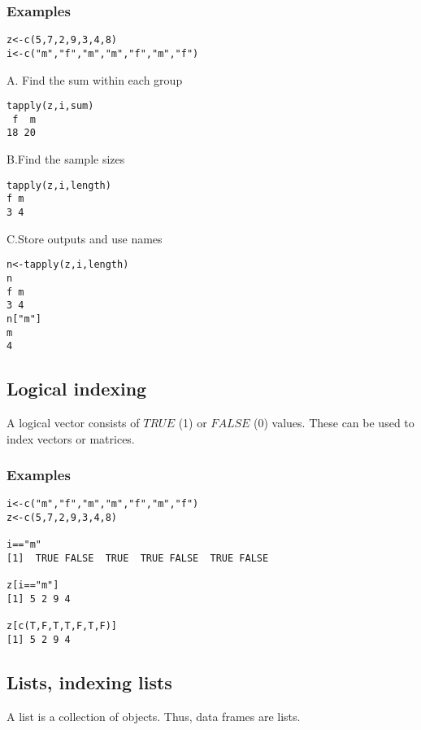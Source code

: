 \documentclass[12pt,a4paper]{article}
\theoremstyle{regla}
\theoremstyle{remark}
\theoremstyle{definition}
\theoremstyle{nonumberbreak}
\begin{document}
\subsubsection{Examples}
\begin{xmpl}
\begin{lstlisting}
z<-c(5,7,2,9,3,4,8)
i<-c("m","f","m","m","f","m","f")
\end{lstlisting}

A. Find the sum within each group
\begin{lstlisting}
tapply(z,i,sum)
 f  m 
18 20 
\end{lstlisting}


B.Find the sample sizes
\begin{lstlisting}
tapply(z,i,length) 
f m 
3 4 
\end{lstlisting}

C.Store outputs and use names
\begin{lstlisting}
n<-tapply(z,i,length) 
n
f m 
3 4 
n["m"]
m 
4 
\end{lstlisting}
\end{xmpl}

\subsection{Logical indexing}
\begin{fbox}
\begin{minipage}{0.97\textwidth}
A logical vector consists of $TRUE$ (1) or $FALSE$ (0) values. These can be used to index vectors or matrices.
\end{minipage}
\end{fbox}
\subsubsection{Examples}
\begin{xmpl}
\begin{lstlisting}
i<-c("m","f","m","m","f","m","f")
z<-c(5,7,2,9,3,4,8)

i=="m"
[1]  TRUE FALSE  TRUE  TRUE FALSE  TRUE FALSE

z[i=="m"]
[1] 5 2 9 4

z[c(T,F,T,T,F,T,F)]
[1] 5 2 9 4
\end{lstlisting}
\end{xmpl}

\subsection{Lists, indexing lists}
\begin{fbox}
\begin{minipage}{0.97\textwidth}
A list is a collection of objects. Thus, data frames are lists.
\end{minipage}
\end{fbox}
\end{document}
